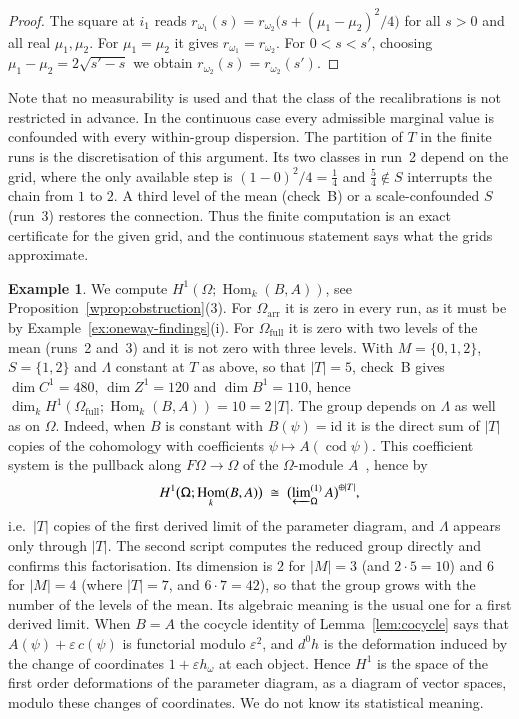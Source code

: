 \documentclass[11pt,a4paper]{article}
\theoremstyle{plain}
\theoremstyle{definition}
\newtheorem{example}[theorem]{Example}
\theoremstyle{remark}
\newcommand{\cat}[1]{\mathsf{#1}}
\newcommand{\catO}{\cat{\Omega}}
\newcommand{\id}{\mathrm{id}}
\DeclareMathOperator{\Hom}{Hom}
\begin{document}
\begin{proof}
The square at $i_1$ reads
$r_{\omega_1}(s) = r_{\omega_2}\bigl(s + (\mu_1-\mu_2)^{2}/4\bigr)$ for all
$s > 0$ and all real $\mu_1,\mu_2$. For $\mu_1 = \mu_2$ it gives
$r_{\omega_1} = r_{\omega_2}$. For $0 < s < s'$, choosing
$\mu_1 - \mu_2 = 2\sqrt{s'-s}$ we obtain
$r_{\omega_2}(s) = r_{\omega_2}(s')$.
\end{proof}

Note that no measurability is used and that the class of the recalibrations is
not restricted in advance. In the continuous case every admissible marginal
value is confounded with every within-group dispersion. The partition of $T$
in the finite runs is the discretisation of this argument. Its two classes in
run~2 depend on the grid, where the only available step is
$(1-0)^{2}/4 = \tfrac14$ and $\tfrac54 \notin S$ interrupts the chain from $1$
to $2$. A third level of the mean (check~B) or a scale-confounded $S$ (run~3)
restores the connection. Thus the finite computation is an exact certificate
for the given grid, and the continuous statement says what the grids
approximate.

\begin{example}\label{ex:oneway-h1}
We compute $H^{1}(\catO;\Hom_k(B,A))$, see
Proposition~\ref{wprop:obstruction}(3). For $\catO_{\mathrm{arr}}$ it is zero
in every run, as it must be by
Example~\ref{ex:oneway-findings}(i). For $\catO_{\mathrm{full}}$ it is zero
with two levels of the mean (runs~2 and~3) and it is not zero with three
levels. With $M = \{0,1,2\}$, $S = \{1,2\}$ and $\Lambda$ constant at $T$ as
above, so that $|T| = 5$, check~B gives $\dim C^{1} = 480$,
$\dim Z^{1} = 120$ and $\dim B^{1} = 110$, hence
$\dim_{k} H^{1}(\catO_{\mathrm{full}};\Hom_k(B,A)) = 10 = 2\,|T|$. The group
depends on $\Lambda$ as well as on $\catO$. Indeed, when $B$ is constant with
$B(\psi) = \id$ it is the direct sum of $|T|$ copies of the cohomology with
coefficients $\psi \mapsto A(\operatorname{cod}\psi)$. This coefficient system
is the pullback along $F\catO \to \catO$ of the $\catO$-module
$A$~\cite[(1.18)(2)]{baues_cohomology_1985}, hence
by~\cite[(8.5)(B)]{baues_cohomology_1985}
\[
H^{1}\bigl(\catO;\Hom_k(B,A)\bigr) \;\cong\; \bigl(\varprojlim\nolimits^{(1)}_{\catO} A\bigr)^{\oplus |T|},
\]
i.e.\ $|T|$ copies of the first derived limit of the parameter diagram, and
$\Lambda$ appears only through $|T|$. The second script computes the reduced
group directly and confirms this factorisation. Its dimension is $2$ for
$|M| = 3$ (and $2 \cdot 5 = 10$) and $6$ for $|M| = 4$ (where $|T| = 7$, and
$6 \cdot 7 = 42$), so that the group grows with the number of the levels of
the mean. Its algebraic meaning is the usual one for a first derived limit.
When $B = A$ the cocycle identity of Lemma~\ref{lem:cocycle} says that
$A(\psi) + \varepsilon\, c(\psi)$ is functorial modulo $\varepsilon^{2}$, and
$d^{0}h$ is the deformation induced by the change of coordinates
$1 + \varepsilon h_\omega$ at each object. Hence $H^{1}$ is the space of the
first order deformations of the parameter diagram, as a diagram of vector
spaces, modulo these changes of coordinates. We do not know its statistical
meaning.
\end{example}
\end{document}
